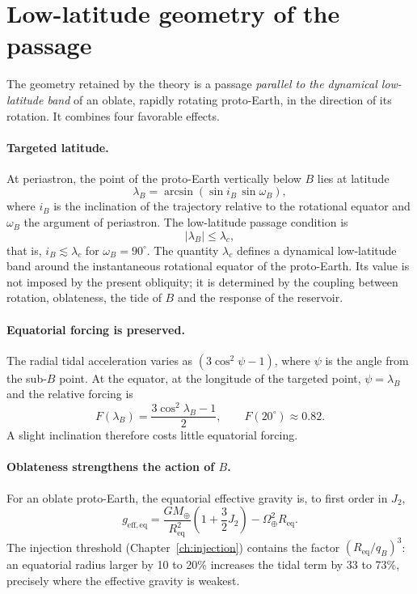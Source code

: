 \documentclass[11pt,a4paper,openany]{report}
\newcommand{\Mt}{M_{\oplus}}
\newcommand{\Req}{R_{\mathrm{eq}}}
\begin{document}
\section{Low-latitude geometry of the passage}
\label{sec:low-latitude}

The geometry retained by the theory is a passage \emph{parallel to the dynamical low-latitude
band} of an oblate, rapidly rotating proto-Earth, in the direction of its rotation. It combines four
favorable effects.

\paragraph{Targeted latitude.}
At periastron, the point of the proto-Earth vertically below $B$ lies at latitude
\begin{equation}
\lambda_B=\arcsin\left(\sin i_B\,\sin\omega_B\right),
\label{eq:lambdaB}
\end{equation}
where $i_B$ is the inclination of the trajectory relative to the rotational equator and $\omega_B$
the argument of periastron. The low-latitude passage condition is
\begin{equation}
|\lambda_B|\le\lambda_c,
\label{eq:low-latitude}
\end{equation}
that is, $i_B\lesssim\lambda_c$ for $\omega_B=90^\circ$. The quantity $\lambda_c$ defines a
dynamical low-latitude band around the instantaneous rotational equator of the proto-Earth. Its
value is not imposed by the present obliquity; it is determined by the coupling between rotation,
oblateness, the tide of $B$ and the response of the reservoir.

\paragraph{Equatorial forcing is preserved.}
The radial tidal acceleration varies as $(3\cos^2\psi-1)$, where $\psi$ is the angle from the
sub-$B$ point. At the equator, at the longitude of the targeted point, $\psi=\lambda_B$ and the
relative forcing is
\begin{equation}
F(\lambda_B)=\frac{3\cos^2\lambda_B-1}{2},
\qquad F(20^\circ)\approx0.82.
\label{eq:Flambda}
\end{equation}
A slight inclination therefore costs little equatorial forcing.

\paragraph{Oblateness strengthens the action of \texorpdfstring{$B$}{B}.}
For an oblate proto-Earth, the equatorial effective gravity is, to first order in $J_2$,
\begin{equation}
g_{\mathrm{eff,eq}}=\frac{G\Mt}{\Req^2}\left(1+\frac32J_2\right)-\Omega_\oplus^2\Req.
\label{eq:geffJ2}
\end{equation}
The injection threshold (Chapter~\ref{ch:injection}) contains the factor $(\Req/q_B)^3$: an
equatorial radius larger by 10 to 20\% increases the tidal term by 33 to 73\%, precisely where the
effective gravity is weakest.
\end{document}
